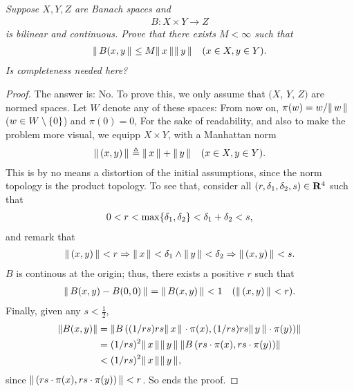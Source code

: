 \textit{
Suppose $X,Y,Z$ are Banach spaces and 
%
  \begin{align*}
    B:X\times Y \to Z
  \end{align*}
is bilinear and continuous. Prove that there exists $M<\infty$ such that 
%
  \begin{align*}
    \| \,B(x, y \, \|_{} \leq M \| \,x \, \|_{}\| \,y \, \|_{} \quad (x\in X, y\in Y).
  \end{align*}
%
Is completeness needed here?}
\begin{proof} The answer is: No. To prove this, we only assume that %
%
  $(X$, $Y$, $Z)$ %
%
are normed spaces. %
Let $W$ denote any of these spaces: From now on, %
%
  $\pi(w) = w/\| \,w \, \|_{}$ ($ w\in W \setminus \{0\}$) and %
  $\pi(0) = 0$,  %
%
For the sake of readability, %
and also to make the problem more visual, we equipp %
%
  $X\times Y$, %
%
with a Manhattan norm %
%
  \begin{align}
    \| \,(x, y) \, \|_{} \triangleq \| \,x \, \|_{} + \| \,y \, \|_{} \quad (x\in X, y \in Y).
  \end{align}
%
This is by no means a distortion of the initial assumptions, %
since the norm topology is the product topology. %
To see that, consider all %
%
  $(r, \delta_1, \delta_2, s)\in {\mathbf R}^4$ %
%
such that %
%
  \begin{align}
    0 < r < \max\{\delta_1, \delta_2\} < \delta_1 + \delta_2 < s, 
  \end{align}
%
and remark that %
%
  \begin{align}
    \| \,(x, y) \, \|_{} < r 
      \Rightarrow 
    \| \,x \, \|_{} < \delta_1 \land 
    \| \,y \, \|_{} < \delta_2
      \Rightarrow 
    \| \,(x, y) \, \|_{} < s .
  \end{align}
$B$ is continous at the origin; thus, there exists a positive $r$ such that %
%
  \begin{align}
    \| \,B(x,y) - B(0, 0) \, \|_{} = \| \,B(x,y) \, \|_{} < 1 \quad (\| \,(x, y) \, \|_{} < r).
  \end{align}
%
Finally, given any $s < \frac{1}{2}$, 
%
  \begin{align}
    \left \| {}{B(x, y)} \right\| 
     & = 
    \left \| B\left(
        (1/rs) rs \| \,x \, \|_{}\cdot \pi(x), 
        (1/rs) rs \| \,y \, \|_{}\cdot \pi(y)
      \right) \right\| \\
      & =
    (1/r s)^{2}\| \,x \, \|_{}\| \,y \, \|_{} 
    \left \| 
      B\left(
        rs\cdot \pi(x), 
        rs \cdot \pi(y) 
        \right) 
      \right\| \\
      & < 
    (1/rs)^2 \| \,x \, \|_{}\| \,y \, \|_{},
  \end{align}
%
since $\| \,(rs \cdot \pi(x), rs \cdot \pi(y)) \, \|_{} < r$. So ends the proof. %
%
\end{proof}
